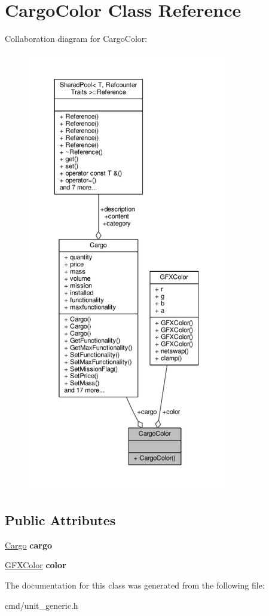 \hypertarget{classCargoColor}{}\section{Cargo\+Color Class Reference}
\label{classCargoColor}


Collaboration diagram for Cargo\+Color\+:
\nopagebreak
\begin{figure}[H]
\begin{center}
\leavevmode
\includegraphics[height=550pt]{d4/d0a/classCargoColor__coll__graph}
\end{center}
\end{figure}
\subsection*{Public Attributes}
\begin{DoxyCompactItemize}
\item 
\hyperlink{classCargo}{Cargo} {\bfseries cargo}\hypertarget{classCargoColor_a92c0de30b5e1444e33fd5f7fa77145e7}{}\label{classCargoColor_a92c0de30b5e1444e33fd5f7fa77145e7}

\item 
\hyperlink{structGFXColor}{G\+F\+X\+Color} {\bfseries color}\hypertarget{classCargoColor_a1f793ba0c1d4aece7ef105308311d27d}{}\label{classCargoColor_a1f793ba0c1d4aece7ef105308311d27d}

\end{DoxyCompactItemize}


The documentation for this class was generated from the following file\+:\begin{DoxyCompactItemize}
\item 
cmd/unit\+\_\+generic.\+h\end{DoxyCompactItemize}
